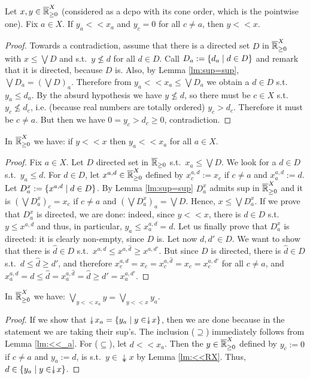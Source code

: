 \begin{lemma}\label{lm:<<RX}
 Let $x,y\in \overline{\mathbb{R}}_{\geq 0}^X$ (considered as a dcpo with its cone order, which is the pointwise one). Fix $a\in X$.
 If $y_a<<x_a$ and $y_c=0$ for all $c\neq a$, then $y<<x$.
\end{lemma}
\begin{proof}
 Towards a contradiction, assume that there is a directed set $D$ in $\overline{\mathbb{R}}_{\geq 0}^X$ with $x\leq\bigvee D$ and s.t.\ $y\not\leq d$ for all $d\in D$.
 Call $D_a:=\{d_a\mid d\in D\}$ and remark that it is directed, because $D$ is.
 Also, by Lemma \ref{lm:sup=sup}, $\bigvee D_a = \left(\bigvee D\right)_a$.
 Therefore from $y_a<<x_a\leq \bigvee D_a$ we obtain a $d\in D$ s.t.\ $y_a\leq d_a$.
 By the absurd hypothesis we have $y\not\leq d$, so there must be $c\in X$ s.t.\ $y_c\not\leq d_c$, i.e. (because real numbers are totally ordered) $y_c>d_c$.
 Therefore it must be $c\neq a$.
 But then we have $0=y_c>d_c\geq 0$, contradiction.
\end{proof}

\begin{lemma}\label{lm:<<_a}
 In $\overline{\mathbb{R}}_{\geq 0}^X$ we have:
 if $y<<x$ then $y_a<< x_a$ for all $a\in X$.
\end{lemma}
\begin{proof}
 Fix $a\in X$.
 Let $D$ directed set in $\overline{\mathbb{R}}_{\geq 0}$ s.t.\ $x_a\leq\bigvee D$.
 We look for a $d\in D$ s.t.\ $y_a\leq d$.
 For $d\in D$, let $x^{a,d}\in\overline{\mathbb{R}}_{\geq 0}^X$ defined by $x^{a,d}_c:=x_c$ if $c\neq a$ and $x^{a,d}_a:=d$.
 Let $D^x_a:=\{x^{a,d}\mid d\in D\}$.
 By Lemma \ref{lm:sup=sup} $D^x_a$ admits sup in $\overline{\mathbb{R}}_{\geq 0}^X$ and it is $(\bigvee D^x_a)_c=x_c$ if $c\neq a$ and $(\bigvee D^x_a)_a=\bigvee D$.
 Hence, $x\leq \bigvee D^x_a$.
 If we prove that $D^x_a$ is directed, we are done: indeed, since $y<<x$, there is $d\in D$ s.t.\ $y\leq x^{a,d}$ and thus, in particular, $y_a\leq x^{a,d}_a=d$.
 Let us finally prove that $D^x_a$ is directed: it is clearly non-empty, since $D$ is.
 Let now $d,d'\in D$.
 We want to show that there is $\hat d\in D$ s.t.\ $x^{a,d}\leq x^{a,\hat d}\geq x^{a,d'}$.
 But since $D$ is directed, there is $\hat d\in D$ s.t.\ $d\leq \hat d\geq d'$, and therefore $x^{a,d}_c=x_c= x^{a,\hat d}_c =x_c=x^{a,d'}_c$ for all $c\neq a$, and $x^{a,d}_a=d\leq \hat d=x^{a,\hat d}_a=\hat d \geq d'=x^{a,d'}_a$.
\end{proof}

\begin{lemma}\label{rmk:sup_a=sup_a}
In $\overline{\mathbb{R}}_{\geq 0}^X$ we have:
$\bigvee\limits_{y<<x_a} y = \bigvee\limits_{y<<x} y_a$.
\end{lemma}
\begin{proof}
 If we show that $\twoheaddownarrow x_a = \set{y_a\mid y\in\twoheaddownarrow x}$, then we are done because in the statement we are taking their sup's.
 The inclusion ($\supseteq$) immediately follows from Lemma \ref{lm:<<_a}. For ($\subseteq$), let $d<< x_a$.
 Then the $y\in \overline{\mathbb{R}}_{\geq 0}^X$ defined by $y_c:=0$ if $c\neq a$ and $y_a:=d$, is s.t.\ $y\in\twoheaddownarrow x$ by Lemma \ref{lm:<<RX}.
 Thus, $d\in \set{y_a\mid y\in\twoheaddownarrow x}$.
\end{proof}


